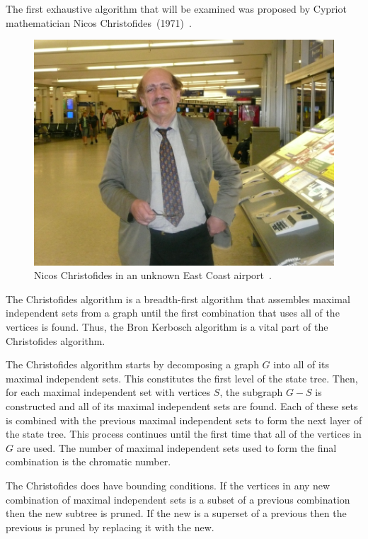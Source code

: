 The first exhaustive algorithm that will be examined was proposed by Cypriot mathematician Nicos
Christofides~(1971)~\cite{christofides}.

\begin{figure}[H]
  \centering
  \includegraphics[width=5in]{christofides}
  \caption{Nicos Christofides in an unknown East Coast airport~\cite{lotus}.}
  \label{fig:pic:christofides}
\end{figure}

The Christofides algorithm is a breadth-first algorithm that assembles maximal independent sets from a graph until
the first combination that uses all of the vertices is found.  Thus, the Bron Kerbosch algorithm is a vital part of
the Christofides algorithm.

The Christofides algorithm starts by decomposing a graph \(G\) into all of its maximal independent sets.  This
constitutes the first level of the state tree.  Then, for each maximal independent set with vertices \(S\), the
subgraph \(G-S\) is constructed and all of its maximal independent sets are found.  Each of these sets is combined
with the previous maximal independent sets to form the next layer of the state tree.  This process continues until
the first time that all of the vertices in \(G\) are used.  The number of maximal independent sets used to form the
final combination is the chromatic number.

The Christofides does have bounding conditions.  If the vertices in any new combination of maximal independent sets
is a subset of a previous combination then the new subtree is pruned.  If the new is a superset of a previous then the
previous is pruned by replacing it with the new.

